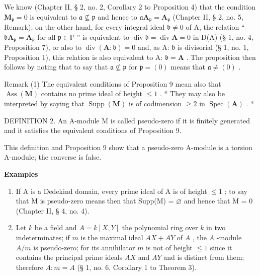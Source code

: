 We know (Chapter II, § 2, no. 2, Corollary 2 to Proposition 4) that the condition \(\mathbf{M}_{\mathfrak{p}} = 0\) is equivalent to \(\mathfrak{a} \nsubseteq \mathfrak{p}\) and hence to \(\mathfrak{a}\mathbf{A}_{\mathfrak{p}} = \mathbf{A}_{\mathfrak{p}}\) (Chapter II, § 2, no. 5, Remark); on the other hand, for every integral ideal \(\mathfrak{b} \neq 0\) of A, the relation `` \(\mathfrak{b}\mathbf{A}_{\mathfrak{p}} = \mathbf{A}_{\mathfrak{p}}\) for all \(\mathfrak{p} \in \mathbb{P}\) '' is equivalent to \(\operatorname{div} \mathfrak{b} = \operatorname{div} \mathbf{A} = 0\) in D(A) (§ 1, no. 4, Proposition 7), or also to \(\operatorname{div}(\mathbf{A}: \mathfrak{b}) = 0\) and, as A: \(\mathfrak{b}\) is divisorial (§ 1, no. 1, Proposition 1), this relation is also equivalent to A: \(\mathfrak{b} = \mathbf{A}\) . The proposition then follows by noting that to say that \(\mathfrak{a} \nsubseteq \mathfrak{p}\) for \(\mathfrak{p} = (0)\) means that \(\mathfrak{a} \neq (0)\) .

Remark (1) The equivalent conditions of Proposition 9 mean also that \(\operatorname{Ass}(\mathbf{M})\) contains no prime ideal of height \(\leqslant 1\) . * They may also be interpreted by saying that \(\operatorname{Supp}(\mathbf{M})\) is of codimension \(\geqslant 2\) in \(\operatorname{Spec}(\mathbf{A})\) . *

DEFINITION 2. An A-module M is called pseudo-zero if it is finitely generated and it satisfies the equivalent conditions of Proposition 9.

This definition and Proposition 9 show that a pseudo-zero A-module is a torsion A-module; the converse is false.

\textbf{Examples}\par

\begin{enumerate}
\def\labelenumi{(\arabic{enumi})}
\item
  If A is a Dedekind domain, every prime ideal of A is of height \(\leqslant1\) ; to say that M is pseudo-zero means then that Supp(M) = \(\varnothing\) and hence that M = 0 (Chapter II, § 4, no. 4).
\item
  Let \(k\) be a field and \(A = k[X, Y]\) the polynomial ring over \(k\) in two indeterminates; if \(m\) is the maximal ideal \(AX + AY\) of \(A\) , the \(A\) -module \(A/m\) is pseudo-zero; for its annihilator \(m\) is not of height \(\leqslant 1\) since it contains the principal prime ideals \(AX\) and \(AY\) and is distinct from them; therefore \(A: m = A\) (§ 1, no. 6, Corollary 1 to Theorem 3).
\end{enumerate}

